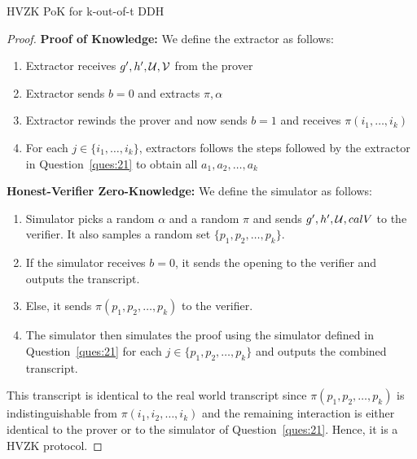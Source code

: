 \begin{solution}{HVZK PoK for k-out-of-t DDH}
\begin{proof}
        \textbf{Proof of Knowledge:} We define the extractor as follows:
        \begin{enumerate}
            \item Extractor receives $g', h', \mathcal{U}, \mathcal{V}$ from the prover
            \item Extractor sends $b = 0$ and extracts $\pi, \alpha$
            \item Extractor rewinds the prover and now sends $b = 1$ and receives $\pi(i_1, \ldots, i_k)$
            \item For each $j \in \{i_1, \ldots, i_k\}$, extractors follows the steps followed by the extractor in Question~\ref{ques:21} to obtain all $a_1, a_2, \ldots, a_k$
        \end{enumerate}

        \textbf{Honest-Verifier Zero-Knowledge:} We define the simulator as follows:
        \begin{enumerate}
            \item Simulator picks a random $\alpha$ and a random $\pi$ and sends $g', h', \mathcal{U}, calV$ to the verifier. It also samples a random set $\{p_1, p_2, \ldots, p_k\}$.
            \item If the simulator receives $b = 0$, it sends the opening to the verifier and outputs the transcript.
            \item Else, it sends $\pi(p_1, p_2, \ldots, p_k)$ to the verifier.
            \item The simulator then simulates the proof using the simulator defined in Question~\ref{ques:21} for each $j \in \{p_1, p_2, \ldots, p_k\}$ and outputs the combined transcript.
        \end{enumerate}
        This transcript is identical to the real world transcript since $\pi(p_1, p_2, \ldots, p_k)$ is indistinguishable from $\pi(i_1, i_2, \ldots, i_k)$ and the remaining interaction is either identical to the prover or to the simulator of Question~\ref{ques:21}. Hence, it is a HVZK protocol.
    \end{proof}
\end{solution}
